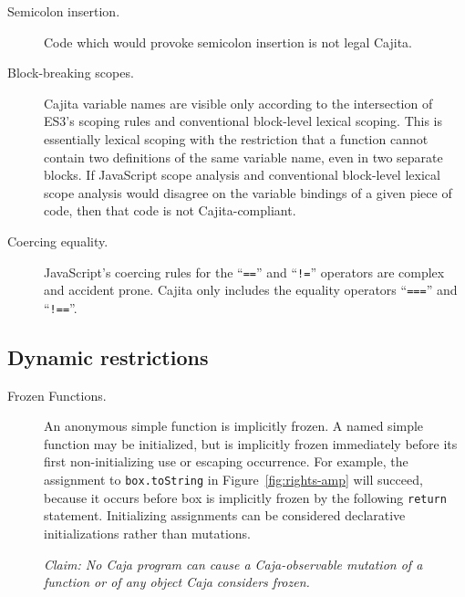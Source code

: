 \documentclass[letterpaper,twocolumn,10pt]{article}
\newcommand{\code}[1]{{\tt {#1}}}              %
\begin{document}
\begin{description}
    \item[Semicolon insertion.] Code which would provoke semicolon insertion 
    is not legal Cajita.
    
    \item[Block-breaking scopes.] Cajita variable names are visible only 
    according to the intersection of ES3's scoping rules and conventional 
    block-level lexical scoping. This is essentially lexical scoping with the 
    restriction that a function cannot contain two definitions of the same 
    variable name, even in two separate blocks. If JavaScript scope analysis
    and conventional block-level lexical scope analysis would disagree on the
    variable bindings of a given piece of code, then that code is not
    Cajita-compliant.     
    
    \item[Coercing equality.] JavaScript's coercing rules for the 
    ``\code{==}'' and ``\code{!=}'' operators are complex and accident prone. 
    Cajita only includes the equality operators ``\code{===}'' and 
    ``\code{!==}''.
        
\end{description}


\subsection{Dynamic restrictions}

\begin{description}

  \item[Frozen Functions.] An anonymous simple function is implicitly frozen. 
  A named simple function may be initialized, but is implicitly frozen 
  immediately before its first non-initializing use or escaping occurrence. 
  For example, the assignment to \code{box.toString} in 
  Figure~\ref{fig:rights-amp} will succeed, because it occurs before box is 
  implicitly frozen by the following \code{return} statement. Initializing 
  assignments can be considered declarative initializations rather than 
  mutations.
  
  \emph{Claim: No Caja program can cause a Caja-observable mutation of a 
  function or of any object Caja considers frozen.}
  
\end{description}
  
\end{document}

